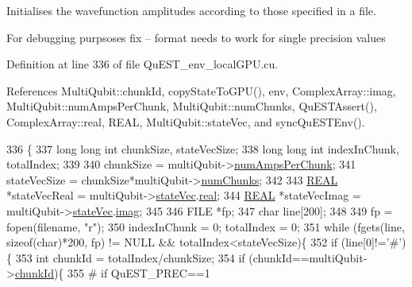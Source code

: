 Initialises the wavefunction amplitudes according to those specified in a file. 

For debugging purpsoses fix -- format needs to work for single precision values 

Definition at line 336 of file Qu\+E\+S\+T\+\_\+env\+\_\+local\+G\+P\+U.\+cu.



References Multi\+Qubit\+::chunk\+Id, copy\+State\+To\+G\+P\+U(), env, Complex\+Array\+::imag, Multi\+Qubit\+::num\+Amps\+Per\+Chunk, Multi\+Qubit\+::num\+Chunks, Qu\+E\+S\+T\+Assert(), Complex\+Array\+::real, R\+E\+AL, Multi\+Qubit\+::state\+Vec, and sync\+Qu\+E\+S\+T\+Env().


\begin{DoxyCode}
336                                                                                             \{
337     \textcolor{keywordtype}{long} \textcolor{keywordtype}{long} \textcolor{keywordtype}{int} chunkSize, stateVecSize;
338     \textcolor{keywordtype}{long} \textcolor{keywordtype}{long} \textcolor{keywordtype}{int} indexInChunk, totalIndex;
339 
340     chunkSize = multiQubit->\mbox{\hyperlink{structMultiQubit_a1cad83601a78635dd278259c7ed54f18}{numAmpsPerChunk}};
341     stateVecSize = chunkSize*multiQubit->\mbox{\hyperlink{structMultiQubit_acd43f2f57991709c9e94f73662c972b2}{numChunks}};
342 
343     \mbox{\hyperlink{QuEST__precision_8h_a4b654506f18b8bfd61ad2a29a7e38c25}{REAL}} *stateVecReal = multiQubit->\mbox{\hyperlink{structMultiQubit_a45483190d6b01ef6b2f98f2bec9ab94f}{stateVec}}.\mbox{\hyperlink{structComplexArray_a4195cac6c784ea1b6271f1c7dba1548a}{real}};
344     \mbox{\hyperlink{QuEST__precision_8h_a4b654506f18b8bfd61ad2a29a7e38c25}{REAL}} *stateVecImag = multiQubit->\mbox{\hyperlink{structMultiQubit_a45483190d6b01ef6b2f98f2bec9ab94f}{stateVec}}.\mbox{\hyperlink{structComplexArray_a79dde47c7ae530c79cebfdf57b225968}{imag}};
345 
346     FILE *fp;
347     \textcolor{keywordtype}{char} line[200];
348 
349     fp = fopen(filename, \textcolor{stringliteral}{"r"});
350     indexInChunk = 0; totalIndex = 0;
351     \textcolor{keywordflow}{while} (fgets(line, \textcolor{keyword}{sizeof}(\textcolor{keywordtype}{char})*200, fp) != NULL && totalIndex<stateVecSize)\{
352         \textcolor{keywordflow}{if} (line[0]!=\textcolor{charliteral}{'#'})\{
353             \textcolor{keywordtype}{int} chunkId = totalIndex/chunkSize;
354             \textcolor{keywordflow}{if} (chunkId==multiQubit->\mbox{\hyperlink{structMultiQubit_ab10c88249fa3825d6227ceec01d37e37}{chunkId}})\{
355 \textcolor{preprocessor}{                                # if QuEST\_PREC==1}

\end{DoxyCode}
